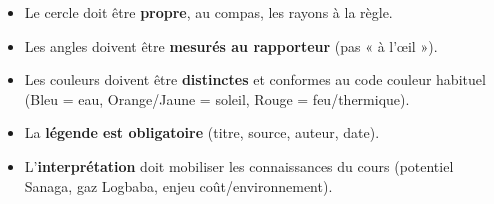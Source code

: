 \documentclass[11pt]{article}
\begin{document}
\begin{attention}
\begin{itemize}
\item Le cercle doit être \textbf{propre}, au compas, les rayons à la règle.
\item Les angles doivent être \textbf{mesurés au rapporteur} (pas « à l'œil »).
\item Les couleurs doivent être \textbf{distinctes} et conformes au code couleur habituel (Bleu = eau, Orange/Jaune = soleil, Rouge = feu/thermique).
\item La \textbf{légende est obligatoire} (titre, source, auteur, date).
\item L'\textbf{interprétation} doit mobiliser les connaissances du cours (potentiel Sanaga, gaz Logbaba, enjeu coût/environnement).
\end{itemize}
\end{attention}
\end{document}
